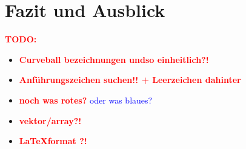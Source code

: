 \documentclass[a4paper,twoside, 11pt, openright]{scrbook}
\theoremstyle{plain} %
\theoremstyle{definition} %
\newcommand{\cb}{Curveball}
\newcommand{\red}[1]{\textcolor{red}{\textbf{#1}}}
\newcommand{\blue}[1]{\textcolor{blue}{#1}}
\begin{document}
\chapter{Fazit und Ausblick}




\newpage
\red{\Huge TODO:}
\begin{itemize}
	\item \red{\Large \cb{} bezeichnungen undso einheitlich?!}
	\item \red{\Large Anführungszeichen suchen!! + Leerzeichen dahinter}
	\item \red{noch was rotes?} \blue{oder was blaues?}
	\item \red{vektor/array?!}
	\item \red{\LaTeX format ?!}
\end{itemize}













\listoffigures{}
\listoftables{}
\end{document}
